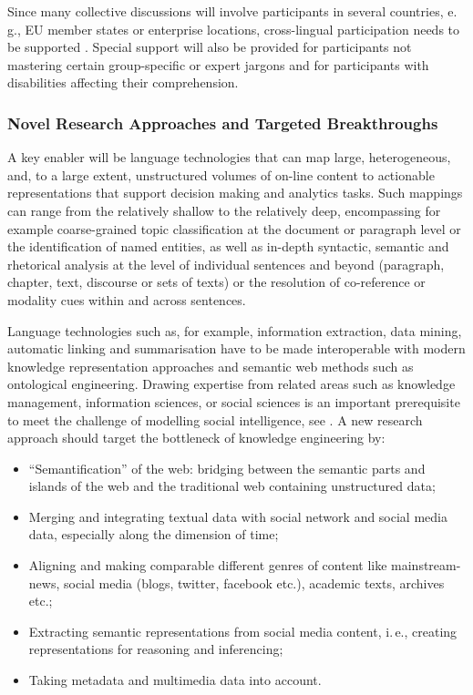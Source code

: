 \documentclass[10pt, plain]{../../metanetpaper}
\begin{document}
\begin{multicols}{2}
Since many collective discussions will involve participants in several countries, e.\,g., EU member states or enterprise locations, cross-lingual participation needs to be supported \cite{ombudsman2012}. Special support will also be provided for participants not mastering certain group-specific or expert jargons and for participants with disabilities affecting their comprehension.

\subsubsection{Novel Research Approaches and Targeted Breakthroughs}
\label{sec:novel-rese-appr-pt2}

A key enabler will be language technologies that can map large, heterogeneous, and, to a large extent, unstructured volumes of on-line content to actionable representations that support decision making and analytics tasks. Such mappings can range from the relatively shallow to the relatively deep, encompassing for example coarse-grained topic classification at the document or paragraph level or the identification of named entities, as well as in-depth syntactic, semantic and rhetorical analysis at the level of individual sentences and beyond (paragraph, chapter, text, discourse or sets of texts) or the resolution of co-reference or modality cues within and across sentences.

Language technologies such as, for example, information extraction, data mining, automatic linking and summarisation have to be made interoperable with modern knowledge representation approaches and semantic web methods such as ontological engineering. Drawing expertise from related areas such as knowledge management, information sciences, or social sciences is an important prerequisite to meet the challenge of modelling social intelligence, see \cite{ltds2012}. A new research approach should target the bottleneck of knowledge engineering by:

\begin{itemize}
\item “Semantification” of the web: bridging between the semantic parts and islands of the web and the traditional web containing unstructured data;
\item Merging and integrating textual data with social network and social media data, especially along the dimension of time;
\item Aligning and making comparable different genres of content like mainstream-news, social media (blogs, twitter, facebook etc.), academic texts, archives etc.;
\item Extracting semantic representations from social media content, i.\,e., creating representations for reasoning and inferencing;
\item Taking metadata and multimedia data into account.
\end{itemize}


\end{multicols}
\end{document}
